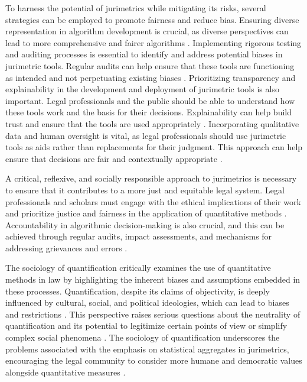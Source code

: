 To harness the potential of jurimetrics while mitigating its risks, several strategies can be employed to promote fairness and reduce bias. Ensuring diverse representation in algorithm development is crucial, as diverse perspectives can lead to more comprehensive and fairer algorithms \cite{unger2021process}. Implementing rigorous testing and auditing processes is essential to identify and address potential biases in jurimetric tools. Regular audits can help ensure that these tools are functioning as intended and not perpetuating existing biases \cite{unger2021process}. Prioritizing transparency and explainability in the development and deployment of jurimetric tools is also important. Legal professionals and the public should be able to understand how these tools work and the basis for their decisions. Explainability can help build trust and ensure that the tools are used appropriately \cite{unger2021process}. Incorporating qualitative data and human oversight is vital, as legal professionals should use jurimetric tools as aids rather than replacements for their judgment. This approach can help ensure that decisions are fair and contextually appropriate \cite{unger2021process}.

A critical, reflexive, and socially responsible approach to jurimetrics is necessary to ensure that it contributes to a more just and equitable legal system. Legal professionals and scholars must engage with the ethical implications of their work and prioritize justice and fairness in the application of quantitative methods \cite{unger2021process}. Accountability in algorithmic decision-making is also crucial, and this can be achieved through regular audits, impact assessments, and mechanisms for addressing grievances and errors \cite{unger2021process}.

The sociology of quantification critically examines the use of quantitative methods in law by highlighting the inherent biases and assumptions embedded in these processes. Quantification, despite its claims of objectivity, is deeply influenced by cultural, social, and political ideologies, which can lead to biases and restrictions \cite{10.1177/09596801221075807, de2010jurimetrics}. This perspective raises serious questions about the neutrality of quantification and its potential to legitimize certain points of view or simplify complex social phenomena \cite{10.1111/ilr.12067, de2010jurimetrics}. The sociology of quantification underscores the problems associated with the emphasis on statistical aggregates in jurimetrics, encouraging the legal community to consider more humane and democratic values alongside quantitative measures \cite{10.1057/s41599-020-00557-0, de2010jurimetrics}.


